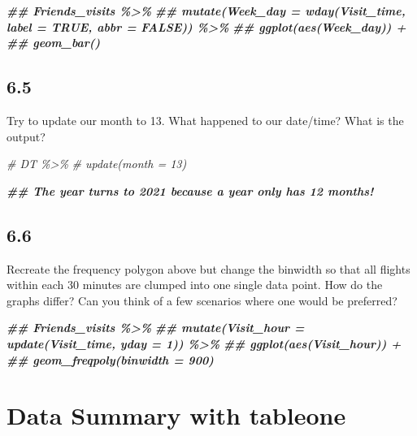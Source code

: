 \documentclass[
]{book}
\newenvironment{Shaded}{\begin{snugshade}}{\end{snugshade}}
\newcommand{\CommentTok}[1]{\textcolor[rgb]{0.56,0.35,0.01}{\textit{#1}}}
\newcommand{\DocumentationTok}[1]{\textcolor[rgb]{0.56,0.35,0.01}{\textbf{\textit{#1}}}}
\begin{document}
\begin{Shaded}
\begin{Highlighting}[]
\DocumentationTok{\#\# Friends\_visits \%\textgreater{}\%}
\DocumentationTok{\#\#  mutate(Week\_day = wday(Visit\_time, label = TRUE, abbr = FALSE)) \%\textgreater{}\%}
\DocumentationTok{\#\#  ggplot(aes(Week\_day)) +}
\DocumentationTok{\#\#  geom\_bar()}
\end{Highlighting}
\end{Shaded}

\hypertarget{section-36}{%
\subsection{6.5}\label{section-36}}

Try to update our month to 13. What happened to our date/time? What is the output?

\begin{Shaded}
\begin{Highlighting}[]
\CommentTok{\# DT \%\textgreater{}\%}
\CommentTok{\#     update(month = 13)}

\DocumentationTok{\#\# The year turns to 2021 because a year only has 12 months!}
\end{Highlighting}
\end{Shaded}

\hypertarget{section-37}{%
\subsection{6.6}\label{section-37}}

Recreate the frequency polygon above but change the binwidth so that all flights within each 30 minutes are clumped into one single data point. How do the graphs differ? Can you think of a few scenarios where one would be preferred?

\begin{Shaded}
\begin{Highlighting}[]
\DocumentationTok{\#\# Friends\_visits \%\textgreater{}\%}
\DocumentationTok{\#\#    mutate(Visit\_hour = update(Visit\_time, yday = 1)) \%\textgreater{}\%}
\DocumentationTok{\#\#    ggplot(aes(Visit\_hour)) +}
\DocumentationTok{\#\#    geom\_freqpoly(binwidth = 900)}
\end{Highlighting}
\end{Shaded}

\hypertarget{data-summary-with-tableone-1}{%
\section{Data Summary with tableone}\label{data-summary-with-tableone-1}}
\end{document}
